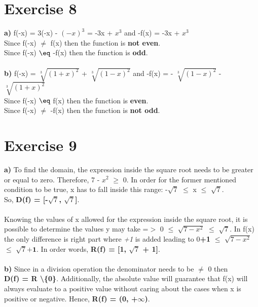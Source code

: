 \documentclass{article}
\begin{document}
  
  \section*{Exercise 8}
  
  \textbf{a)} f(-x) = 3(-x) - $(-x)^3$ = -3x + $x^3$ and -f(x) = -3x + $x^3$ \\
  Since f(-x) $\neq$ f(x) then the function is \textbf{not even}. \\
  Since f(-x) $\eq$ -f(x) then the function is \textbf{odd}. \\ \\
  \textbf{b)} f(-x) = $\sqrt[3]{(1+x)^2}$ + $\sqrt[3]{(1-x)^2}$ and -f(x) = - $\sqrt[3]{(1-x)^2}$ - $\sqrt[3]{(1+x)^2}$ \\
  Since f(-x) $\eq$ f(x) then the function is \textbf{even}. \\
  Since f(-x) $\neq$ -f(x) then the function is \textbf{not odd}.
  
  \section*{Exercise 9}
  \textbf{a)} To find the domain, the expression inside the square root needs to be greater or equal to zero. Therefore, 7 - $x^2$ $\geq$ 0. In order for the former mentioned condition to be true, x has to fall inside this range: -$\sqrt{7}$ $\leq$ x $\leq$ $\sqrt{7}$. \\
  So, \textbf{D(f) = [-$\sqrt{7}$, $\sqrt{7}$]}. \\ \\ 
  Knowing the values of x allowed for the expression inside the square root, it is possible to determine the values y may take =$>$ 0 $\leq$ $\sqrt{7 - x^2}$ $\leq$ $\sqrt{7}$. In f(x) the only difference is right part where \textit{+1} is added leading to 0\textbf{+1} $\leq$ $\sqrt{7 - x^2}$ $\leq$ $\sqrt{7} \textbf{+1}$. In order words, \textbf{R(f) = [1, $\sqrt{7}$ + 1]}. \\ \\
  \textbf{b)} Since in a division operation the denominator needs to be $\neq$ 0 then \\ \textbf{D(f) = R \textbackslash \{0\}}. Additionally, the absolute value will guarantee that f(x) will always evaluate to a positive value without caring about the cases when x is positive or negative. Hence, \textbf{R(f) = (0, +$\infty$)}.
  
\end{document}
